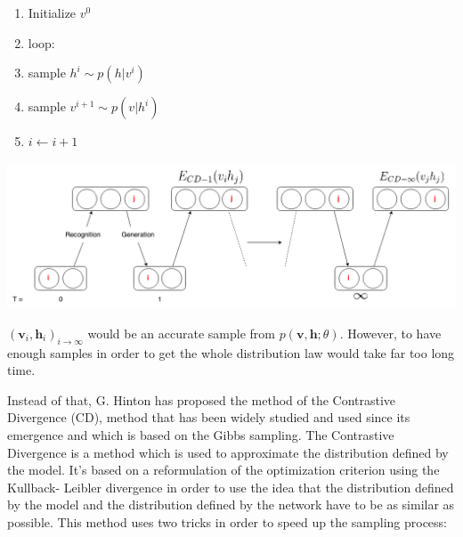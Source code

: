 \documentclass{report}
\begin{document}
	\begin{enumerate}
		\item Initialize $v^0$
		\item loop:
		\item sample $h^i \sim p(h | v^i)$
		\item sample $v^{i+1} \sim p(v | h^i)$
		\item $i \leftarrow i+1$
	\end{enumerate}

	\vspace{0.5cm}
	\begin{center}
		\includegraphics[scale=0.5]{ressources/GibbsSampling}
	\end{center}
	\vspace{0.5cm}

	
	$(\textbf{v}_i,\textbf{h}_i)_{i \rightarrow \infty}$ would be an accurate sample 
	from $p(\textbf{v}, \textbf{h}; \theta)$. However, to have enough samples in order 
	to get the whole distribution law would take far too long time.
	
	Instead of that, G. Hinton \cite{hinton2006fast} has proposed 
	the method of the Contrastive Divergence (CD), method that has been widely 
	studied and used since its emergence \cite{bengio2009justifying} and 
	which is based on the Gibbs sampling. The Contrastive Divergence is a method 
	which is used to approximate the distribution defined by the model. It's based 
	on a reformulation of the optimization criterion using the Kullback- Leibler 
	divergence in order to use the idea that the distribution defined by the model 
	and the distribution defined by the network have to be as similar as possible. 
	This method uses two tricks in order to speed up the sampling process:
	
\end{document}
